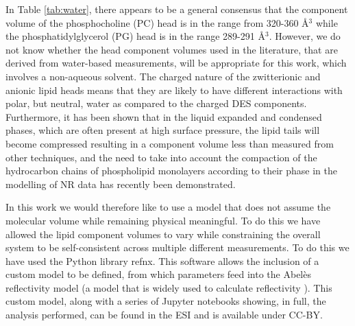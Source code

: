 \documentclass[twoside,twocolumn,9pt]{article}
\begin{document}
In Table \ref{tab:water}, there appears to be a general consensus that the component volume of the phosphocholine (PC) head is in the range from 320-360 \AA$^3$ while the phosphatidylglycerol (PG) head is in the range 289-291 \AA$^3$. However, we do not know whether the head component volumes used in the literature, that are derived from water-based measurements, will be appropriate for this work, which involves a non-aqueous solvent. The charged nature of the zwitterionic and anionic lipid heads means that they are likely to have different interactions with polar, but neutral, water as compared to the charged DES components.\cite{Sanchez-Fernandez2018} Furthermore, it has been shown that in the liquid expanded and condensed phases, which are often present at high surface pressure, the lipid tails will become compressed resulting in a component volume less than measured from other techniques,\cite{Marsh2010,Small1984} and the need to take into account the compaction of the hydrocarbon chains of phospholipid monolayers according to their phase in the modelling of NR data has recently been demonstrated.\cite{Campbell2018}

In this work we would therefore like to use a model that does not assume the molecular volume while remaining physical meaningful. To do this we have allowed the lipid component volumes to vary while constraining the overall system to be self-consistent across multiple different measurements. To do this we have used the Python library refnx\cite{Nelson2018}. This software allows the inclusion of a custom model to be defined, from which parameters feed into the Abel\`{e}s reflectivity model (a model that is widely used to calculate reflectivity \cite{Abeles1950,Parratt1954}). This custom model, along with a series of Jupyter notebooks showing, in full, the analysis performed, can be found in the ESI and is available under CC-BY.\cite{mccluskey_2018c}
\end{document}

